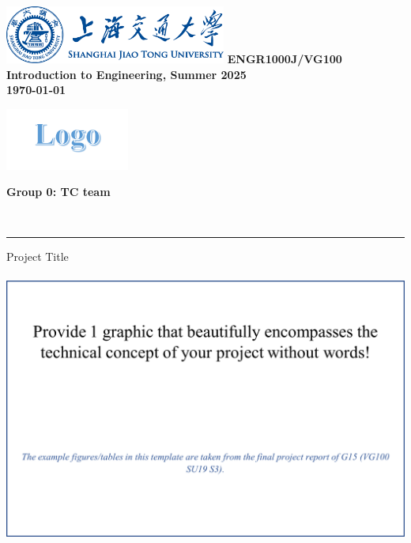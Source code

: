 \documentclass{engr1000j-s2}
\begin{document}
  \thispagestyle{firstpage}
  \includegraphics[height=0.75in]{figures/sjtubannerblue.png}
  \newline
  \newline
  \textbf{\Large ENGR1000J/VG100 Introduction to Engineering, Summer 2025}\\[0.5em]
  \textbf{{\Large \today}}

  \begin{center}

    \begin{minipage}{0.45\textwidth}
      \includegraphics[height=0.8in]{figures/team logo.png}
    \end{minipage}\hfill
    \begin{minipage}{0.45\textwidth}
      \textbf{\Large Group 0: TC team}
    \end{minipage}\\[0.2em]
  \end{center}

  \noindent
  {\color{gray!30}\rule{\textwidth}{0.1pt}}

  {\Huge Project Title}

  \begin{center}
    \includegraphics[height=3.5in]{figures/preface_picture.png}
  \end{center}
\end{document}
